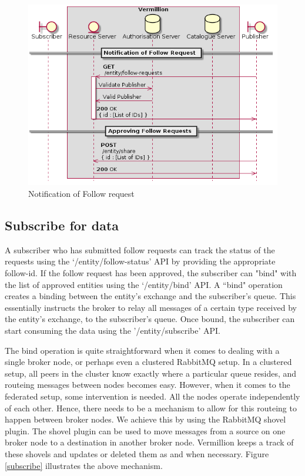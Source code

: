 \documentclass[conference, 10pt]{IEEEtran}
\begin{document}
\begin{figure}
\includegraphics[width=\linewidth, height=\linewidth, keepaspectratio]{follow-status.png}
\caption{Notification of Follow request}
\label{notify}
\end{figure}

\subsection{Subscribe for data}

A subscriber who has submitted follow requests can track the status of the requests using the ‘/entity/follow-status’ API by providing the appropriate follow-id. If the follow request has been approved, the subscriber can "bind" with the list of approved entities using the ‘/entity/bind’ API. A ``bind" operation creates a binding between the entity's exchange and the subscriber's queue. This essentially instructs the broker to relay all messages of a certain type received by the entity's exchange, to the subscriber's queue. Once bound, the subscriber can start consuming the data using the '/entity/subscribe' API.

The bind operation is quite straightforward when it comes to dealing with a single broker node, or perhaps even a clustered RabbitMQ setup. In a clustered setup, all peers in the cluster know exactly where a particular queue resides, and routeing messages between nodes becomes easy. However, when it comes to the federated setup, some intervention is needed. All the nodes operate independently of each other. Hence, there needs to be a mechanism to allow for this routeing to happen between broker nodes. We achieve this by using the RabbitMQ shovel plugin. The shovel plugin can be used to move messages from a source on one broker node to a destination in another broker node. Vermillion keeps a track of these shovels and updates or deleted them as and when necessary. Figure  \ref{subscribe} illustrates the above mechanism.
\end{document}
